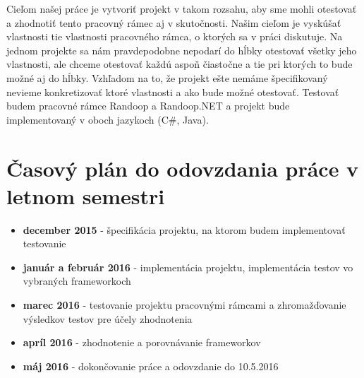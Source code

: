 \documentclass[11pt,twoside,slovak,a4paper]{article}
\begin{document}
	Cieľom našej práce je vytvoriť projekt v takom rozsahu, aby sme mohli otestovať a zhodnotiť tento pracovný rámec aj v skutočnosti. Našim cieľom je vyskúšať vlastnosti tie vlastnosti pracovného rámca, o ktorých sa v práci diskutuje. Na jednom projekte sa nám pravdepodobne nepodarí do hĺbky otestovať všetky jeho vlastnosti, ale chceme otestovať každú aspoň čiastočne a tie pri ktorých to bude možné aj do hĺbky. Vzhľadom na to, že projekt ešte nemáme špecifikovaný nevieme konkretizovať ktoré vlastnosti a ako bude možné otestovať. Testovať budem pracovné rámce Randoop a Randoop.NET a projekt bude implementovaný v oboch jazykoch (C\#, Java).
	
	\section{Časový plán do odovzdania práce v letnom semestri}
	\begin{itemize}
		\item \textbf{december 2015} - špecifikácia projektu, na ktorom budem implementovať testovanie
		\item \textbf{január a február 2016} - implementácia projektu, implementácia testov vo vybraných frameworkoch
		\item \textbf{marec 2016} - testovanie projektu pracovnými rámcami a zhromažďovanie výsledkov testov pre účely zhodnotenia
		\item \textbf{apríl 2016} - zhodnotenie a porovnávanie frameworkov
		\item \textbf{máj 2016} - dokončovanie práce a odovzdanie do 10.5.2016
	\end{itemize}
 	
 	\begin{titlepage}
 		
 		
 	\end{titlepage}
	
\end{document}
